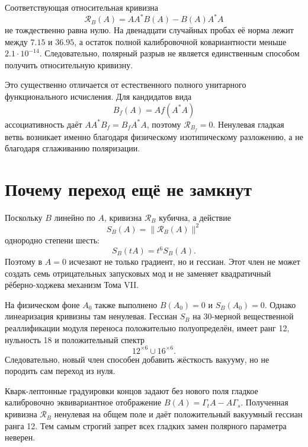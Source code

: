 Соответствующая относительная кривизна
\begin{equation}
 \mathcal R_B(A)=AA^*B(A)-B(A)A^*A
 \label{eq:v8-smooth-relative-curvature}
\end{equation}
не тождественно равна нулю. На двенадцати случайных пробах её норма лежит
между $7.15$ и $36.95$, а остаток полной калибровочной ковариантности меньше
$2.1\cdot10^{-14}$. Следовательно, полярный разрыв не является единственным
способом получить относительную кривизну.

Это существенно отличается от естественного полного унитарного
функционального исчисления. Для кандидатов вида
\begin{equation}
 B_f(A)=A f(A^*A)
 \label{eq:v8-natural-functional-order}
\end{equation}
ассоциативность даёт $AA^*B_f=B_fA^*A$, поэтому
$\mathcal R_{B_f}=0$. Ненулевая гладкая ветвь возникает именно благодаря
физическому изотипическому разложению, а не благодаря сглаживанию поляризации.

\section{Почему переход ещё не замкнут}

Поскольку $B$ линейно по $A$, кривизна $\mathcal R_B$ кубична, а действие
\begin{equation}
 S_B(A)=\|\mathcal R_B(A)\|^2
 \label{eq:v8-smooth-relative-action}
\end{equation}
однородно степени шесть:
\begin{equation}
 S_B(tA)=t^6S_B(A).
 \label{eq:v8-smooth-relative-degree-six}
\end{equation}
Поэтому в $A=0$ исчезают не только градиент, но и гессиан. Этот член не
может создать семь отрицательных запусковых мод и не заменяет квадратичный
рёберно-ходжева механизм Тома VII.

На физическом фоне $A_0$ также выполнено $B(A_0)=0$ и $S_B(A_0)=0$.
Однако линеаризация кривизны там ненулевая. Гессиан $S_B$ на 30-мерной
вещественной реаллификации модуля переноса положительно полуопределён, имеет
ранг 12, нульность 18 и положительный спектр
\begin{equation}
 12^{\times6}\cup16^{\times6}.
 \label{eq:v8-smooth-relative-vacuum-hessian-spectrum}
\end{equation}
Следовательно, новый член способен добавить жёсткость вакууму, но не
породить сам переход из нуля.

\begin{theorem}
Кварк-лептонные градуировки концов задают без нового поля гладкое
калибровочно эквивариантное отображение $B(A)=\Gamma_tA-A\Gamma_s$. Полученная
кривизна $\mathcal R_B$ ненулевая на общем поле и даёт положительный
вакуумный гессиан ранга 12. Тем самым строгий запрет всех гладких замен
полярного параметра неверен.
\end{theorem}

